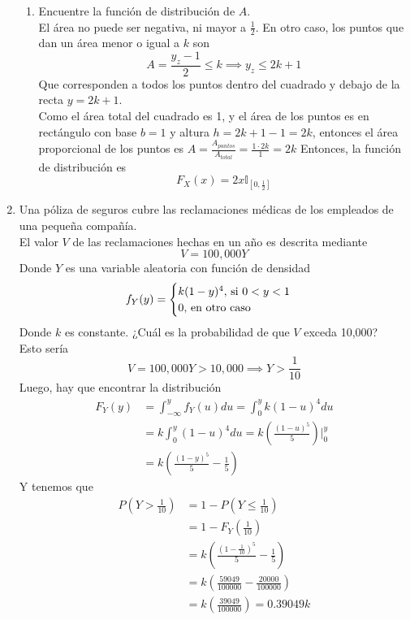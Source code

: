 \documentclass[12pt,a4paper]{report}
\begin{document}
\begin{enumerate}
{\begin{enumerate}
{				}
				\item {
					Encuentre la función de distribución de $A$.\\
					El área no puede ser negativa, ni mayor a $\frac{1}{2}$.
					En otro caso, los puntos que dan un área menor o igual a $k$
					son
					\[A = \frac{y_z-1}{2} \leq k \implies y_z \leq 2k + 1\]
					Que corresponden a todos los puntos dentro del cuadrado y
					debajo de la recta $y = 2k+1$.\\
					Como el área total del cuadrado es 1, y el área de los
					puntos es en rectángulo con base $b = 1$
					y altura $h = 2k+1-1 = 2k$, entonces el área proporcional de
					los puntos es
					$A = \frac{A_{puntos}}{A_{total}} = \frac{1 \cdot 2k}{1} = 2k$
					Entonces, la función de distribución es
					\[F_X(x) = 2x \mathbb{I}_{[0, \frac{1}{2}]}\]
				}
			\end{enumerate}
		}
		\item {
			Una póliza de seguros cubre las reclamaciones médicas de los empleados
			de una pequeña compañía.\\
			El valor $V$ de las reclamaciones hechas en un año es descrita mediante
			\[V = 100,000Y\]
			Donde $Y$ es una variable aleatoria con función de densidad
			\[
				f_Y(y) = \begin{cases}
								k(1-y)^4, $ si $ 0 < y < 1\\
								0, $ en otro caso$
							  \end{cases}
			\]
			Donde $k$ es constante. ¿Cuál es la probabilidad de que $V$ exceda 10,000?\\
			Esto sería
			\[V = 100,000Y > 10,000 \implies Y > \frac{1}{10}\]
			Luego, hay que encontrar la distribución
			\begin{align*}
				F_Y(y) &= \int_{-\infty}^{y}{f_Y(u)du} = \int_{0}^{y}{k(1-u)^4du}\\
					   &= k\int_{0}^{y}{(1-u)^4du} = k (\frac{(1-u)^5}{5})\Big|_0^y\\
					   &= k(\frac{(1-y)^5}{5} - \frac{1}{5})
			\end{align*}
			Y tenemos que
			\begin{align*}
				P(Y > \frac{1}{10}) &= 1 - P(Y \leq \frac{1}{10})\\
									&= 1 - F_Y(\frac{1}{10})\\
									&= k(\frac{(1-\frac{1}{10})^5}{5} - \frac{1}{5})\\
									&= k(\frac{59049}{100000} - \frac{20000}{100000})\\
									&= k(\frac{39049}{100000}) = 0.39049k

\end{align*}}
\end{enumerate}
\end{document}

